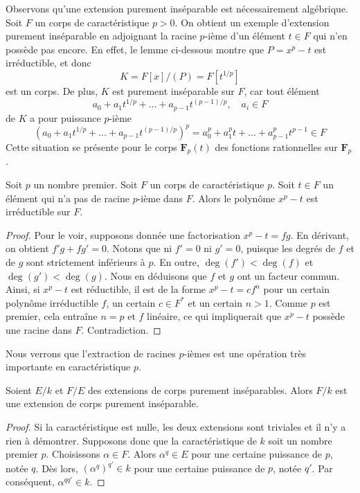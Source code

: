 \noindent
Observons qu'une extension purement inséparable est nécessairement algébrique.
Soit $F$ un corps de caractéristique $p > 0$.
On obtient un exemple d'extension purement inséparable en adjoignant
la racine $p$-ième d'un élément $t \in F$ qui n'en possède pas encore. En effet,
le lemme ci-dessous montre que $P = x^p - t$ est irréductible, et donc
$$
K = F[x]/(P) = F[t^{1/p}]
$$
est un corps. De plus, $K$ est purement inséparable sur $F$, car tout élément
$$
a_0 + a_1t^{1/p} + \ldots + a_{p - 1}t^{(p - 1)/p},\quad a_i \in F
$$
de $K$ a pour puissance $p$-ième
$$
(a_0 + a_1t^{1/p} + \ldots + a_{p - 1}t^{(p - 1)/p})^p =
a_0^p + a_1^p t + \ldots + a_{p - 1}^pt^{p - 1} \in F
$$
Cette situation se présente pour le corps
$\mathbf{F}_p(t)$ des fonctions rationnelles sur $\mathbf{F}_p$.

\begin{lemma}
\label{lemma-take-pth-root}
Soit $p$ un nombre premier. Soit $F$ un corps de caractéristique $p$.
Soit $t \in F$ un élément qui n'a pas de racine $p$-ième dans $F$.
Alors le polynôme $x^p - t$ est irréductible sur $F$.
\end{lemma}

\begin{proof}
Pour le voir, supposons donnée une factorisation
$x^p - t = f g$. En dérivant, on obtient $f' g + f g' = 0$.
Notons que ni $f' = 0$ ni $g' = 0$, puisque les degrés de $f$ et de $g$
sont strictement inférieurs à $p$. En outre, $\deg(f') < \deg(f)$ et $\deg(g') < \deg(g)$.
Nous en déduisons que $f$ et $g$ ont un facteur commun. Ainsi, si $x^p - t$
est réductible, il est de la forme $x^p - t = c f^n$ pour un certain polynôme
irréductible $f$, un certain $c \in F^*$ et un certain $n > 1$. Comme $p$ est premier,
cela entraîne $n = p$ et $f$ linéaire, ce qui impliquerait que $x^p - t$ possède
une racine dans $F$. Contradiction.
\end{proof}

\noindent
Nous verrons que l'extraction de racines $p$-ièmes est une opération très importante
en caractéristique $p$.

\begin{lemma}
\label{lemma-purely-inseparable-permanence}
Soient $E/k$ et $F/E$ des extensions de corps purement inséparables. Alors $F/k$
est une extension de corps purement inséparable.
\end{lemma}

\begin{proof}
Si la caractéristique est nulle, les deux extensions sont triviales et il n'y a
rien à démontrer. Supposons donc que la caractéristique de $k$ soit un nombre
premier $p$. Choisissons $\alpha \in F$. Alors
$\alpha^q \in E$ pour une certaine puissance de $p$, notée $q$. Dès lors, $(\alpha^q)^{q'} \in k$
pour une certaine puissance de $p$, notée $q'$. Par conséquent, $\alpha^{qq'} \in k$.
\end{proof}

